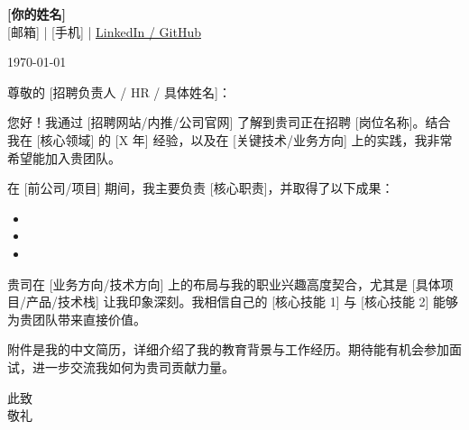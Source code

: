 \documentclass[12pt,a4paper]{ctexart}
\newcommand{\namesection}[1]{%
  \begin{center}
    {\Huge\bfseries #1}\\[6pt]
    {\normalsize [邮箱] | [手机] | \href{[LinkedIn/GitHub链接]}{LinkedIn / GitHub}}
  \end{center}
  \vspace{16pt}
}
\newcommand{\currentdate}[1]{{\flushright #1\par\vspace{16pt}}}
\newcommand{\lettercontent}[1]{{#1\par\vspace{12pt}}}
\newcommand{\closing}[1]{{#1\par\vspace{24pt}}}
\newcommand{\signature}[1]{{\flushright #1\par}}
\begin{document}
\namesection{[你的姓名]}

\currentdate{\today}


\lettercontent{尊敬的 [招聘负责人 / HR / 具体姓名]：}

\lettercontent{您好！我通过 [招聘网站/内推/公司官网] 了解到贵司正在招聘 [岗位名称]。结合我在 [核心领域] 的 [X 年] 经验，以及在 [关键技术/业务方向] 上的实践，我非常希望能加入贵团队。}

\lettercontent{在 [前公司/项目] 期间，我主要负责 [核心职责]，并取得了以下成果：}

\begin{itemize}
    \item [具体成果 1 - 尽量量化]
    \item [具体成果 2]
    \item [具体成果 3]
\end{itemize}

\lettercontent{贵司在 [业务方向/技术方向] 上的布局与我的职业兴趣高度契合，尤其是 [具体项目/产品/技术栈] 让我印象深刻。我相信自己的 [核心技能 1] 与 [核心技能 2] 能够为贵团队带来直接价值。}

\lettercontent{附件是我的中文简历，详细介绍了我的教育背景与工作经历。期待能有机会参加面试，进一步交流我如何为贵司贡献力量。}

\closing{此致\\敬礼}

\signature{[你的姓名]}
\end{document}
